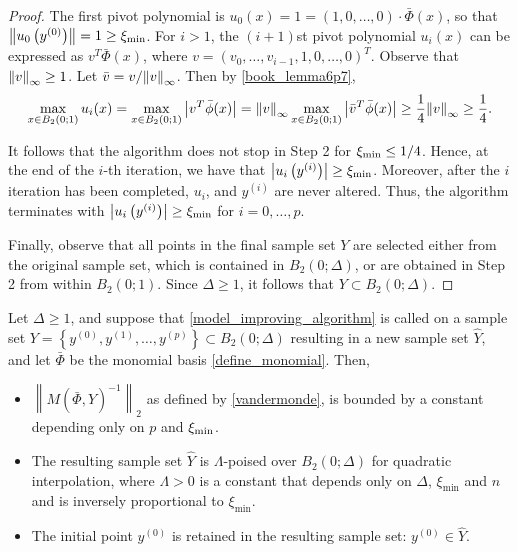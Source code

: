 \documentclass{article}
\begin{document}
\begin{proof}

The first pivot polynomial is $u_0(x) = 1 = (1, 0, \ldots, 0)\cdot \bar\Phi(x)$, so that $\left\|u_0\left(y^{(0)}\right)\right\| = 1 \ge \xi_{\text{min}}$.
For $i > 1$, the $(i+1)$st pivot polynomial $u_i(x)$ can be expressed as $v^T \bar{\Phi}(x)$,
where $v = (v_0, \ldots, v_{i-1},1,0,\ldots,0)^T$.
Observe that ${\left\|v\right\|}_{\infty} \ge 1$.
Let $\bar{v} = v/{\left\|v\right\|}_{\infty}$.
Then by \cref{book_lemma6p7},
\[ \max_{x \in B_2(0;1)} u_i(x) = \max_{x \in B_2(0;1)} \left| v^T \bar{\phi}(x)\right| =
{\left\|v\right\|}_{\infty} \max_{x \in B_2(0;1)}  \left|\bar{v}^T \bar{\phi}(x)\right| \ge \frac{1}{4} {\left\|v\right\|}_{\infty} \ge \frac{1}{4}.\]

It follows that the algorithm does not stop in Step 2 for $\xi_{\text{min}} \le 1/4$.   Hence, at the end of the $i$-th iteration, we have that  $\left| u_i\left(y^{(i)}\right)\right| \ge \xi_{\text{min}}$.  Moreover,  after the $i$ iteration has been completed,  $u_i$,  and $y^{(i)}$ are never altered.  Thus, the algorithm terminates with  $\left| u_i\left(y^{(i)}\right)\right| \ge \xi_{\text{min}}$ for $i=0, \ldots, p$.

Finally,  observe that all points in the final sample set $Y$ are selected either from the original sample set, which is contained in $B_2(0;\Delta)$,  or are obtained in Step 2 from within $B_2(0;1)$.  Since $\Delta  \ge 1$, it follows that $Y \subset B_2(0;\Delta)$.

\end{proof}



\begin{theorem}
\label{set_is_poised}

Let $\Delta \ge 1$, and suppose that \cref{model_improving_algorithm} is called on a sample set 
$Y = \left\{y^{(0)}, y^{(1)}, \ldots, y^{(p)}\right\} \subset B_2(0; \Delta)$ 
resulting in a new sample set $\hat Y$,
and let $\bar{\Phi}$ be the monomial basis \cref{define_monomial}.
Then,
\begin{itemize}
\item $\left\|M(\bar \Phi, \hat Y)^{-1}\right\|_2$ as defined by \cref{vandermonde}, is bounded by a constant depending only on $p$ and $\xi_{\text{min}}$.
\item The resulting sample set $\hat Y$ is $\Lambda$-poised over $B_2\left(0;\Delta\right)$ for quadratic interpolation,
where $\Lambda > 0$ is a constant that depends only on $\Delta$, $\xi_{\text{min}}$ and $n$ and is inversely proportional to $\xi_{\text{min}}$.
\item The initial point $y^{(0)}$ is retained in the resulting sample set: $y^{(0)} \in \hat Y$.
\end{itemize}
\end{theorem}
\end{document}
